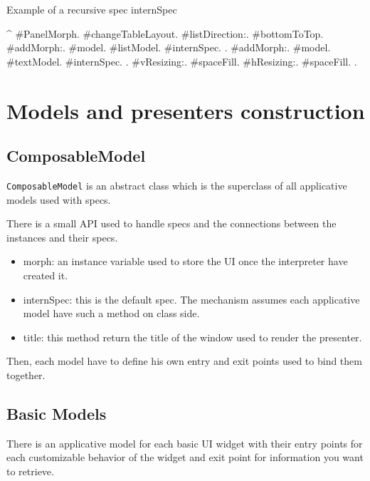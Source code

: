 \documentclass[a4paper,10pt,twoside]{book}
\begin{document}
\begin{method}{Example of a recursive spec}
internSpec

	^	{  #PanelMorph.
			#changeTableLayout.
			#listDirection:. #bottomToTop.
			#addMorph:.   { #model. #listModel. #internSpec.	 }.
			#addMorph:.	  { #model. #textModel. #internSpec. 	}.
			#vResizing:. 	#spaceFill.
			#hResizing:. 	#spaceFill.	}.
\end{method} 

\section{Models and presenters construction}

\subsection{ComposableModel}

\verb?ComposableModel? is an abstract class which is the superclass of all applicative models used with specs.

There is a small API used to handle specs and the connections between the instances and their specs.

\begin{itemize}
	\item morph: an instance variable used to store the UI once the interpreter have created it.
	\item internSpec: this is the default spec. The mechanism assumes each applicative model have such a method on class side.
	\item title: this method return the title of the window used to render the presenter.
\end{itemize}

Then, each model have to define his own entry and exit points used to bind them together.

\subsection{Basic Models}

There is an applicative model for each basic UI widget  with their entry points for each customizable behavior of the widget and exit point for information you want to retrieve.  
\end{document}
